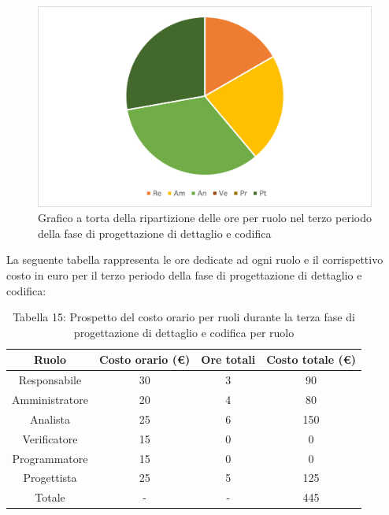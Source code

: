 \begin{figure}[H]
    \centering
    \includegraphics[scale=0.6]{img/grafi preventivo/torta/codifica/periodo3.png}
    \caption{Grafico a torta della ripartizione delle ore per ruolo nel terzo periodo della fase di progettazione di dettaglio e codifica}
\end{figure}
La seguente tabella rappresenta le ore dedicate ad ogni ruolo e il corrispettivo costo in euro per il terzo periodo della fase di progettazione di dettaglio e codifica:
\begin{table}[h]
	\setlength\extrarowheight{5pt}
	\centering
	\begin{tabularx}{\textwidth}{|ccc|c|}
		\hline
		\rowcolor{white}
		\textbf{Ruolo} & \textbf{Costo orario (€)} & \textbf{Ore totali} & \textbf{Costo totale (€)} \\
		\hline
		Responsabile &30&3&90 \\
		Amministratore &20&4&80 \\
		Analista &25&6&150 \\
		Verificatore &15&0&0 \\
		Programmatore &15&0&0 \\
		Progettista &25&5&125 \\
		\hline
		Totale &-&-&445 \\
		\hline
	\end{tabularx}
    \vspace{10pt}
	\caption{Tabella 15: Prospetto del costo orario per ruoli durante la terza fase di progettazione di dettaglio e codifica per ruolo}
\end{table}
%
